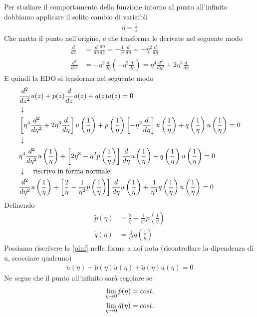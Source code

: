Per studiare il comportamento della funzione intorno al punto all'infinito dobbiamo applicare il solito cambio di variaibli
\begin{align}
	\eta = \frac{1}{z}
\end{align}
Che matta il punto nell'origine, e che trasforma le derivate nel seguente modo
\begin{align}
	\frac{d}{dz} &= \frac{d}{d\eta} \frac{d\eta}{dz} = -\frac{1}{z^2} \frac{d}{d\eta} = -\eta^2 \frac{d}{d\eta}\\
	\frac{d^2}{dz^2} &= -\eta^2 \frac{d}{d\eta} \left(-\eta^2 \frac{d}{d\eta}\right) = \eta^4 \frac{d^2}{d\eta^2} + 2\eta^3 \frac{d}{d\eta}
\end{align}
E quindi la EDO si trasforma nel seguente modo
\begin{align}
	&\frac{d^2}{dz^2} u(z) + p(z)\frac{d}{dz} u(z) + q(z)u(z) = 0 \\ &\downarrow \nonumber \\
	&\left[\eta^4 \frac{d^2}{d\eta^2} + 2\eta^3 \frac{d}{d\eta}\right] u\left(\frac{1}{\eta}\right) + p\left(\frac{1}{\eta}\right)\left[-\eta^2 \frac{d}{d\eta}\right]u\left(\frac{1}{\eta}\right) + q\left(\frac{1}{\eta}\right)u\left(\frac{1}{\eta}\right) = 0 \nonumber \\ &\downarrow \nonumber \\
	&\eta^4 \frac{d^2}{d\eta^2}u\left(\frac{1}{\eta}\right) + \left[2\eta^3 -\eta^2p\left(\frac{1}{\eta}\right) \right] \frac{d}{d\eta}u\left(\frac{1}{\eta}\right) + q\left(\frac{1}{\eta}\right)u\left(\frac{1}{\eta}\right) = 0 \nonumber \\ &\downarrow \quad \text{riscrivo in forma normale} \nonumber \\
	&\frac{d^2}{d\eta^2}u\left(\frac{1}{\eta}\right) + \left[\frac{2}{\eta} -\frac{1}{\eta^2}p\left(\frac{1}{\eta}\right) \right] \frac{d}{d\eta}u\left(\frac{1}{\eta}\right) + \frac{1}{\eta^4} q\left(\frac{1}{\eta}\right)u\left(\frac{1}{\eta}\right) = 0 \label{pinf}
\end{align}
Definendo
\begin{align}
	\tilde{p}(\eta) &= \frac{2}{\eta} -\frac{1}{\eta^2}p\left(\frac{1}{\eta}\right) \\
	\tilde{q}(\eta) &= \frac{1}{\eta^4} q\left(\frac{1}{\eta}\right)
\end{align}
Possiamo riscrivere la \ref{pinf} nella forma a noi nota (ricontrollare la dipendenza di u, scocciare qualcuno)
\begin{align}
	\ddot{u}(\eta) + \tilde{p}(\eta) \dot{u}(\eta) + \tilde{q}(\eta) u(\eta) = 0
\end{align}
Ne segue che il punto all'infinito sarà regolare se
\begin{align}
	&\underset{\eta \rightarrow 0}{\lim} \, \tilde{p}(\eta) = cost.\\
	&\underset{\eta \rightarrow 0}{\lim} \, \tilde{q}(\eta) = cost.
\end{align}
